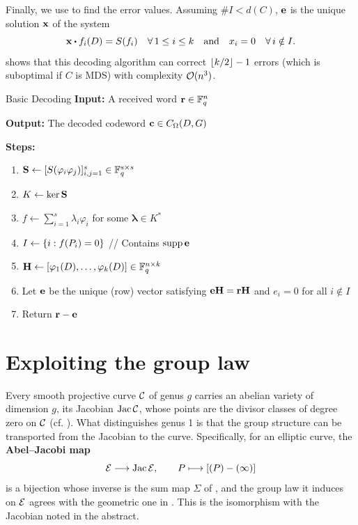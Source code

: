 \documentclass[twocolumn, 11pt]{scrartcl}
\begin{document}
Finally, we use \cite[Prop.~6.1]{o2008key} to find the error values. Assuming $\#I<d(C)$, $\mathbf{e}$ is the unique solution $\mathbf{x}$ of the system
\[ \bfx\dotpr f_i(D)=S(f_i)\quad\forall 1\leq i\leq k\qand x_i=0\quad\forall i\notin I. \]
\cite[Prop.~6.5]{o2008key} shows that this decoding algorithm can correct $\lfloor k/2\rfloor-1$ errors (which is suboptimal if $C$ is MDS) with complexity $\mathcal{O}(n^3)$.

\begin{algorithm}{Basic Decoding \cite[\S6.2]{hoholdt1998algebraic}}{}
    \textbf{Input:} A received word $\mathbf{r}\in\mathbb{F}_q^n$
    
    \textbf{Output:} The decoded codeword $\mathbf{c}\in C_\Omega(D,G)$
    
    \textbf{Steps:}
    
    \begin{enumerate}[itemsep=-2pt]
        \item $\mathbf{S}\gets[S(\varphi_i\varphi_j)]_{i,j=1}^s\in\mathbb{F}_q^{s\times s}$
        \item $K\gets\ker\mathbf{S}$ \quad
        \item $f\gets\sum_{i=1}^s \lambda_i\varphi_i$ for some $\bm\lambda\in K^*$
        \item $I\gets\{i:f(P_i)=0\}$ \quad // Contains $\operatorname{supp}\mathbf{e}$
        \item $\mathbf{H}\gets[\varphi_1(D),\hdots,\varphi_k(D)]\in\mathbb{F}_q^{n\times k}$
        \item Let $\mathbf{e}$ be the unique (row) vector satisfying $\mathbf{e}\mathbf{H}=\mathbf{r}\mathbf{H}$ and $e_i=0$ for all $i\notin I$
        \item Return $\mathbf{r}-\mathbf{e}$
    \end{enumerate}
\end{algorithm}

\section{Exploiting the group law} \label{section:group-law}

Every smooth projective curve $\mathcal{C}$ of genus $g$ carries an abelian variety of dimension $g$, its Jacobian $\operatorname{Jac}\mathcal{C}$, whose points are the divisor classes of degree zero on $\mathcal{C}$ (cf. ). What distinguishes genus 1 is that the group structure can be transported from the Jacobian to the curve. Specifically, for an elliptic curve, the \textbf{Abel--Jacobi map}
\[ \mathcal{E}\longrightarrow\operatorname{Jac}\mathcal{E}, \qquad P\longmapsto[(P)-(\infty)] \]
is a bijection whose inverse is the sum map $\Sigma$ of , and the group law it induces on $\mathcal{E}$ agrees with the geometric one in \cite[\S III.3]{silverman2009arithmetic}. This is the isomorphism with the Jacobian noted in the abstract.
\end{document}
